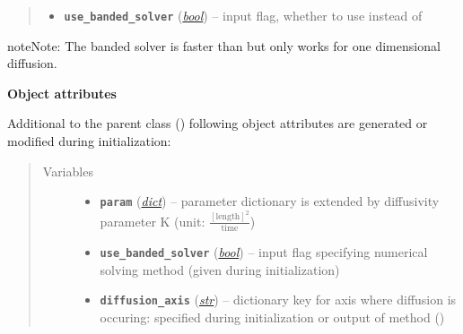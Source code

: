\documentclass[a4paper,10pt,english]{sphinxmanual}
\begin{document}
\begin{fulllineitems}
\begin{quote}
\begin{description}
\begin{itemize}
\item {} 
\textbf{\texttt{use\_banded\_solver}} (\href{http://docs.python.org/2.7/library/functions.html\#bool}{\emph{bool}}) -- input flag, whether to use 
\href{http://docs.scipy.org/doc/scipy/reference/generated/scipy.linalg.solve\_banded.html\#scipy.linalg.solve\_banded}{}
instead of \href{http://docs.scipy.org/doc/numpy/reference/generated/numpy.linalg.solve.html\#numpy.linalg.solve}{}

\end{itemize}

\end{description}\end{quote}

\begin{notice}{note}{Note:}
The banded solver \href{http://docs.scipy.org/doc/scipy/reference/generated/scipy.linalg.solve\_banded.html\#scipy.linalg.solve\_banded}{} is faster than 
\href{http://docs.scipy.org/doc/numpy/reference/generated/numpy.linalg.solve.html\#numpy.linalg.solve}{} but only works for one dimensional diffusion.
\end{notice}

\textbf{Object attributes}

Additional to the parent class 
{\hyperref[api/climlab.process:climlab.process.implicit.ImplicitProcess]{\emph{}}} ()
following object attributes are generated or modified during initialization:
\begin{quote}\begin{description}
\item[{Variables}] \leavevmode\begin{itemize}
\item {} 
\textbf{\texttt{param}} (\href{http://docs.python.org/2.7/library/stdtypes.html\#dict}{\emph{dict}}) -- parameter dictionary is extended by 
diffusivity parameter K (unit:
\(\frac{[\textrm{length}]^2}{\textrm{time}}\))

\item {} 
\textbf{\texttt{use\_banded\_solver}} (\href{http://docs.python.org/2.7/library/functions.html\#bool}{\emph{bool}}) -- input flag specifying numerical solving 
method (given during initialization)

\item {} 
\textbf{\texttt{diffusion\_axis}} (\href{http://docs.python.org/2.7/library/functions.html\#str}{\emph{str}}) -- dictionary key for axis where diffusion 
is occuring: 
specified during initialization
or output of method 
{\hyperref[api/climlab.dynamics:climlab.dynamics.diffusion._guess_diffusion_axis]{\emph{}}} ()


\end{itemize}
\end{description}
\end{quote}
\end{fulllineitems}
\end{document}
